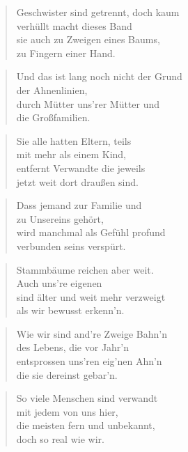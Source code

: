\documentclass[10pt,a4paper]{article}
\begin{document}
\begin{multicols}{2}
\begin{verse}
Geschwister sind getrennt, doch kaum \\
verhüllt macht dieses Band \\
sie auch zu Zweigen eines Baums, \\
zu Fingern einer Hand. \\
\end{verse}

\begin{verse}
Und das ist lang noch nicht der Grund \\
der Ahnenlinien, \\
durch Mütter uns’rer Mütter und \\
die Großfamilien. \\
\end{verse}

\begin{verse}
Sie alle hatten Eltern, teils \\
mit mehr als einem Kind, \\
entfernt Verwandte die jeweils \\
jetzt weit dort draußen sind. \\
\end{verse}

\begin{verse}
Dass jemand zur Familie und \\
zu Unsereins gehört, \\
wird manchmal als Gefühl profund \\
verbunden seins verspürt. \\
\end{verse}

\begin{verse}
Stammbäume reichen aber weit. \\
Auch uns’re eigenen \\
sind älter und weit mehr verzweigt \\
als wir bewusst erkenn’n. \\
\end{verse}

\begin{verse}
Wie wir sind and’re Zweige Bahn’n \\
des Lebens, die vor Jahr’n \\
entsprossen uns’ren eig’nen Ahn’n \\
die sie dereinst gebar’n. \\
\end{verse}

\begin{verse}
So viele Menschen sind verwandt \\
mit jedem von uns hier, \\
die meisten fern und unbekannt, \\
doch so real wie wir. \\
\end{verse}


\end{multicols}
\end{document}
